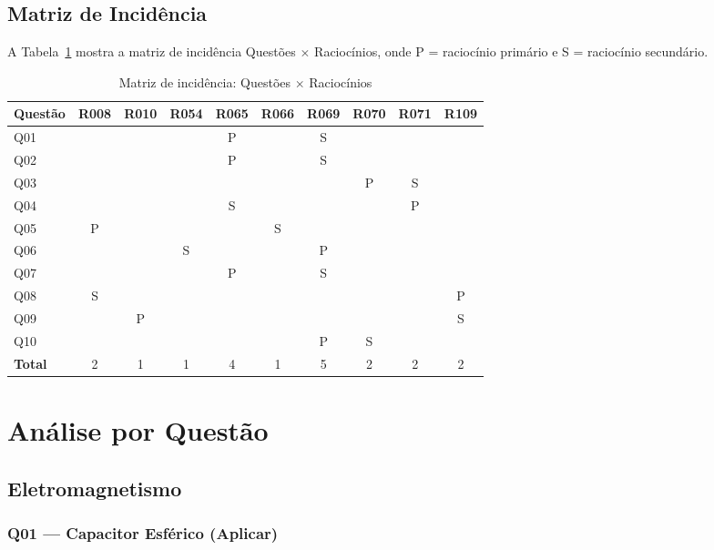 \documentclass[12pt,a4paper]{article}
\newcommand{\bloom}[1]{\textcolor{verdeexame}{\textbf{#1}}}
\begin{document}
\subsection{Matriz de Incidência}

A Tabela~\ref{tab:matriz} mostra a matriz de incidência Questões
$\times$ Raciocínios, onde P = raciocínio primário e S = raciocínio
secundário.

\begin{table}[H]
\centering
\caption{Matriz de incidência: Questões $\times$ Raciocínios}
\label{tab:matriz}
\begin{tabular}{lccccccccc}
\toprule
\textbf{Questão} & R008 & R010 & R054 & R065 & R066 & R069 & R070 & R071 & R109 \\
\midrule
Q01 &   &   &   & P &   & S &   &   &   \\
Q02 &   &   &   & P &   & S &   &   &   \\
Q03 &   &   &   &   &   &   & P & S &   \\
Q04 &   &   &   & S &   &   &   & P &   \\
Q05 & P &   &   &   & S &   &   &   &   \\
Q06 &   &   & S &   &   & P &   &   &   \\
Q07 &   &   &   & P &   & S &   &   &   \\
Q08 & S &   &   &   &   &   &   &   & P \\
Q09 &   & P &   &   &   &   &   &   & S \\
Q10 &   &   &   &   &   & P & S &   &   \\
\midrule
\textbf{Total} & 2 & 1 & 1 & 4 & 1 & 5 & 2 & 2 & 2 \\
\bottomrule
\end{tabular}
\end{table}

\section{Análise por Questão}

\subsection{Eletromagnetismo}

\subsubsection{Q01 --- Capacitor Esférico (\bloom{Aplicar})}
\end{document}
